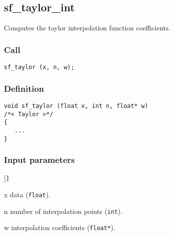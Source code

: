 \subsection{{sf\_taylor\_int}}
Computes the taylor interpolation function coefficients.

\subsubsection*{Call}
\begin{verbatim}sf_taylor (x, n, w);\end{verbatim}

\subsubsection*{Definition}
\begin{verbatim}
void sf_taylor (float x, int n, float* w) 
/*< Taylor >*/
{
   ...
}
\end{verbatim}

\subsubsection*{Input parameters}
\begin{desclist}{\tt }{\quad}[\tt ]
   \setlength\itemsep{0pt}
   \item[x] data (\texttt{float}).  
   \item[n] number of interpolation points (\texttt{int}).  
   \item[w] interpolation coefficients (\texttt{float*}).  
\end{desclist}




